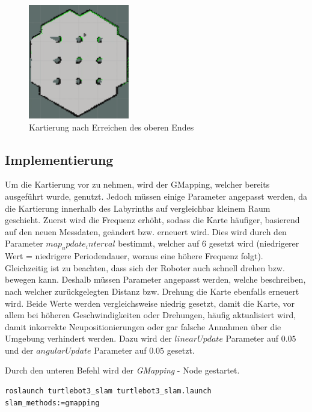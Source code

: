 {{\begin{figure}[H]
\begin{minipage}{0.5\textwidth}
				\centering
				\includegraphics[height=5cm]{Bilder/mapping_smpl_4.png}
				\caption{Kartierung nach Erreichen des oberen Endes}
				\label{pic:mapping_smpl_4}	
			\end{minipage}
		\end{figure}
	}
	\subsection{Implementierung}
	{
		Um die Kartierung vor zu nehmen, wird der GMapping, welcher bereits ausgeführt wurde, genutzt. Jedoch müssen einige Parameter angepasst werden, da die Kartierung innerhalb des Labyrinths auf vergleichbar kleinem Raum geschieht. Zuerst wird die Frequenz erhöht, sodass die Karte häufiger, basierend auf den neuen Messdaten, geändert bzw. erneuert wird. Dies wird durch den Parameter $map_update_interval$ bestimmt, welcher auf $6$ gesetzt wird (niedrigerer Wert = niedrigere Periodendauer, woraus eine höhere Frequenz folgt). Gleichzeitig ist zu beachten, dass sich der Roboter auch schnell drehen bzw. bewegen kann. Deshalb müssen Parameter angepasst werden, welche beschreiben, nach welcher zurückgelegten Distanz bzw. Drehung die Karte ebenfalls erneuert wird. Beide Werte werden vergleichsweise niedrig gesetzt, damit die Karte, vor allem bei höheren Geschwindigkeiten oder Drehungen, häufig aktualisiert wird, damit inkorrekte Neupositionierungen oder gar falsche Annahmen über die Umgebung verhindert werden. Dazu wird der $linearUpdate$ Parameter auf $0.05$ und der $angularUpdate$ Parameter auf $0.05$ gesetzt.
		
		Durch den unteren Befehl wird der \emph{GMapping} - Node gestartet.
		\begin{lstlisting}
roslaunch turtlebot3_slam turtlebot3_slam.launch slam_methods:=gmapping
		\end{lstlisting}

	}	

}
